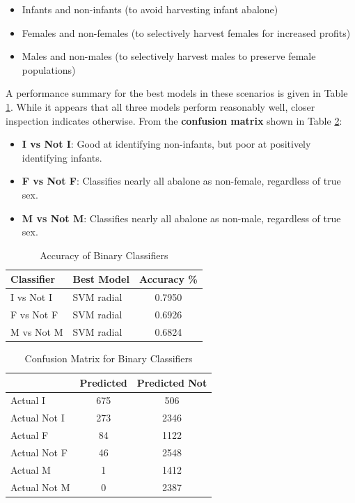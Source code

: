 \documentclass[11pt, a4paper]{article}
\begin{document}
    \begin{itemize}
        \item Infants and non-infants (to avoid harvesting infant abalone)
        \item Females and non-females (to selectively harvest females for increased profits)
        \item Males and non-males (to selectively harvest males to preserve female populations)
    \end{itemize}

    A performance summary for the best models in these scenarios is given in Table \ref{binary}. While it appears that all three models perform reasonably well, closer inspection indicates otherwise. From the \textbf{confusion matrix} shown in Table \ref{cms}:

    \begin{itemize}
        \item \textbf{I vs Not I}: Good at identifying non-infants, but poor at positively identifying infants.
        \item \textbf{F vs Not F}: Classifies nearly all abalone as non-female, regardless of true sex.
        \item \textbf{M vs Not M}: Classifies nearly all abalone as non-male, regardless of true sex.
    \end{itemize}  

    \begin{table}[ht]
        \centering
        \begin{tabular}{|l|l|c|}
            \hline
            Classifier  & Best Model    & Accuracy \% \\
            \hline
            I vs Not I  & SVM radial    & 0.7950 \\
            F vs Not F  & SVM radial    & 0.6926 \\
            M vs Not M  & SVM radial    & 0.6824 \\
            \hline
        \end{tabular}
        \caption{Accuracy of Binary Classifiers}
        \label{binary}
    \end{table}

    \begin{table}
        \centering
        \begin{tabular}{|l|c|c|}
            \hline
                            & Predicted & Predicted Not \\
            \hline
            Actual I        & 675       & 506 \\
            Actual Not I    & 273       & 2346 \\
            \hline
            Actual F        & 84        & 1122 \\
            Actual Not F    & 46        & 2548 \\
            \hline
            Actual M        & 1         & 1412 \\
            Actual Not M    & 0         & 2387 \\
            \hline           
        \end{tabular}
        \caption{Confusion Matrix for Binary Classifiers}
        \label{cms}
    \end{table}
\end{document}
